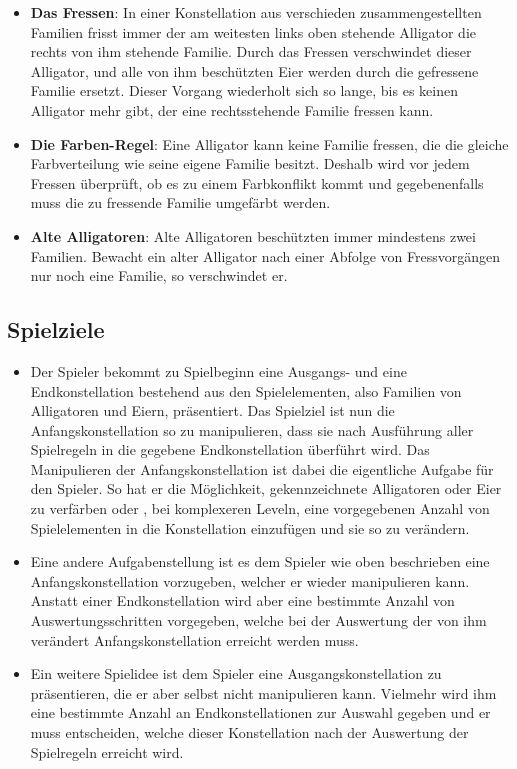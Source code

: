 	\begin{itemize}

	\item \textbf{Das Fressen}: In einer Konstellation aus verschieden zusammengestellten Familien frisst immer der am weitesten links oben stehende Alligator die rechts von ihm stehende Familie.
	Durch das Fressen verschwindet dieser Alligator, und alle von ihm beschützten Eier werden durch die gefressene Familie ersetzt.
	Dieser Vorgang wiederholt sich so lange, bis es keinen Alligator mehr gibt, der eine rechtsstehende Familie fressen kann.

	\item \textbf{Die Farben-Regel}: Eine Alligator kann keine Familie fressen, die die gleiche Farbverteilung wie seine eigene Familie besitzt.
	Deshalb wird vor jedem Fressen überprüft, ob es zu einem Farbkonflikt kommt und gegebenenfalls muss die zu fressende Familie umgefärbt werden.

	\item \textbf{Alte Alligatoren}: Alte Alligatoren beschützten immer mindestens zwei Familien.
	Bewacht ein alter Alligator nach einer Abfolge von Fressvorgängen nur noch eine Familie, so verschwindet er.

	\end{itemize}

\subsection{Spielziele}

	\begin{itemize}

		\item Der Spieler bekommt zu Spielbeginn eine Ausgangs- und eine Endkonstellation bestehend aus den Spielelementen, also Familien von Alligatoren und Eiern, präsentiert.
		Das Spielziel ist nun die Anfangskonstellation so zu manipulieren, dass sie nach Ausführung aller Spielregeln in die gegebene Endkonstellation überführt wird.
		Das Manipulieren der Anfangskonstellation ist dabei die eigentliche Aufgabe für den Spieler.
		So hat er die Möglichkeit, gekennzeichnete Alligatoren oder Eier zu verfärben oder , bei komplexeren Leveln, eine vorgegebenen Anzahl von Spielelementen in die Konstellation einzufügen und sie so zu verändern.

		\item Eine andere Aufgabenstellung ist es dem Spieler wie oben beschrieben eine Anfangskonstellation vorzugeben, welcher er wieder manipulieren kann.
		Anstatt einer Endkonstellation wird aber eine bestimmte Anzahl von Auswertungsschritten vorgegeben, welche bei der Auswertung der von ihm verändert Anfangskonstellation erreicht werden muss.

		\item Ein weitere Spielidee ist dem Spieler eine Ausgangskonstellation zu präsentieren, die er aber selbst nicht manipulieren kann.
		Vielmehr wird ihm eine bestimmte Anzahl an Endkonstellationen zur Auswahl gegeben und er muss entscheiden, welche dieser Konstellation nach der Auswertung der Spielregeln erreicht wird.

	\end{itemize}


